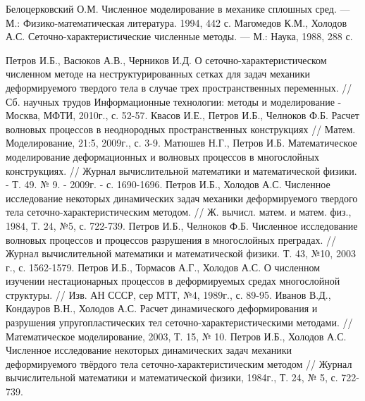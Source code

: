 \begin{thebibliography}{99}
Белоцерковский О.М. Численное моделирование в механике
сплошных сред. — М.: Физико-математическая литература. 1994, 442 с.
Магомедов К.М., Холодов А.С. Сеточно-характеристические
численные методы. — М.: Наука, 1988, 288 с.

Петров И.Б., Васюков А.В., Черников И.Д. О сеточно-характеристическом численном методе на неструктурированных сетках для задач механики деформируемого твердого тела в случае трех пространственных переменных. // Сб. научных трудов Информационные технологии: методы и моделирование - Москва, МФТИ, 2010г., с. 52-57.
Квасов И.Е., Петров И.Б., Челноков Ф.Б. Расчет волновых процессов в неоднородных пространственных конструкциях // Матем. Моделирование, 21:5, 2009г., с. 3-9.
Матюшев Н.Г., Петров И.Б. Математическое моделирование деформационных и волновых процессов в многослойных конструкциях. // Журнал вычислительной математики и математической физики. - Т. 49. № 9. - 2009г. - с. 1690-1696.
Петров И.Б., Холодов А.С. Численное исследование некоторых динамических задач механики деформируемого твердого тела сеточно-характеристическим методом. // Ж. вычисл. матем. и матем. физ., 1984, Т. 24, №5, с. 722-739.
Петров И.Б., Челноков Ф.Б. Численное исследование волновых процессов и процессов разрушения в многослойных преградах. // Журнал вычислительной математики и математической физики. Т. 43, №10, 2003 г., с. 1562-1579.
Петров И.Б., Тормасов А.Г., Холодов А.С. О численном изучении нестационарных процессов в деформируемых средах многослойной структуры. // Изв. АН СССР, сер МТТ, №4, 1989г., с. 89-95. 
Иванов В.Д., Кондауров В.Н., Холодов А.С. Расчет динамического деформирования и разрушения упругопластических тел сеточно-характеристическими методами. // Математическое моделирование, 2003, Т. 15, № 10.
Петров И.Б., Холодов А.С. Численное исследование некоторых динамических задач механики деформируемого твёрдого тела сеточно-характеристическим методом // Журнал вычислительной математики и математической физики, 1984г., Т. 24, № 5, с. 722-739.


\end{thebibliography}
